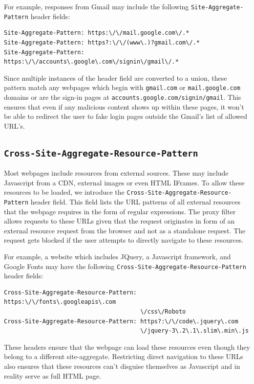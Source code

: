 For example, responses from Gmail may include the following {\tt Site-Aggregate-Pattern} header fields:

\begin{verbatim}
Site-Aggregate-Pattern: https:\/\/mail.google.com\/.*
Site-Aggregate-Pattern: https?:\/\/(www\.)?gmail.com\/.*
Site-Aggregate-Pattern: https:\/\/accounts\.google\.com\/signin\/gmail\/.*
\end{verbatim}

Since multiple instances of the header field are converted to a union, these pattern match any webpages which begin with {\tt gmail.com} or {\tt mail.google.com} domains or are the sign-in pages at {\tt accounts.google.com/signin/gmail}. This ensures that even if any malicious content shows up within these pages, it won't be able to redirect the user to fake login pages outside the Gmail's list of allowed URL's.

\subsection{\texttt{Cross-Site-Aggregate-Resource-Pattern}}

Most webpages include resources from external sources. These may include Javascript from a CDN, external images or even HTML IFrames. To allow these resources to be loaded, we introduce the {\tt Cross-Site-Aggregate-Resource-Pattern} header field. This field lists the URL patterns of all external resources that the webpage requires in the form of regular expressions. The proxy filter allows requests to these URLs given that the request originates in form of an external resource request from the browser and not as a standalone request. The request gets blocked if the user attempts to directly navigate to these resources.

For example, a website which includes JQuery, a Javascript framework, and Google Fonts may have the following {\tt Cross-Site-Aggregate-Resource-Pattern} header fields:

\begin{verbatim}
Cross-Site-Aggregate-Resource-Pattern: https:\/\/fonts\.googleapis\.com
                                       \/css\/Roboto
Cross-Site-Aggregate-Resource-Pattern: https?:\/\/code\.jquery\.com
                                       \/jquery-3\.2\.1\.slim\.min\.js
\end{verbatim}

These headers ensure that the webpage can load these resources even though they belong to a different site-aggregate. Restricting direct navigation to these URLs also ensures that these resources can't disguise themselves as Javascript and in reality serve as full HTML page.

